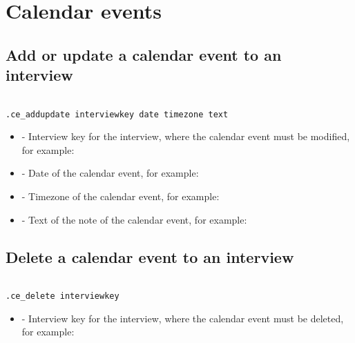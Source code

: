 \section{Calendar events}
\subsection{Add or update a calendar event to an interview}

\begin{lstlisting}[style=CommandLineStyle, showlines=true]

.ce_addupdate interviewkey date timezone text

\end{lstlisting}

\paramsheader
\begin{itemize}

  \item {} - Interview key for the interview, where the
  calendar event must be modified, for example:

  \item {} - Date of the calendar event, for example:

  \item {} - Timezone of the calendar event, for example:

  \item {} - Text of the note of the calendar event, for example:

\end{itemize}

\subsection{Delete a calendar event to an interview}
\begin{lstlisting}[style=CommandLineStyle, showlines=true]

.ce_delete interviewkey

\end{lstlisting}

\paramsheader
\begin{itemize}
    \item {} - Interview key for the interview, where the
    calendar event must be deleted, for example:

\end{itemize}
